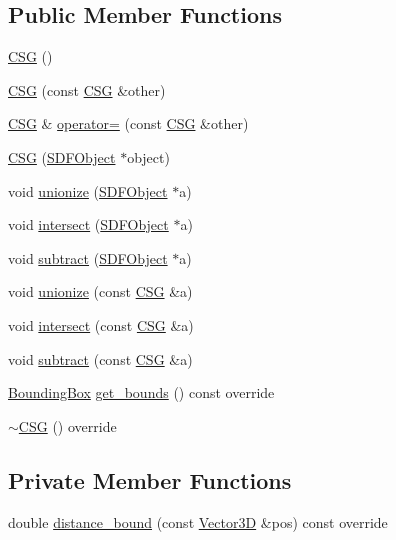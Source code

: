 \subsection*{Public Member Functions}
\begin{DoxyCompactItemize}
\item 
\hyperlink{classCSG_a09bbc9336539ecf40021a9b3ec224afd}{C\+SG} ()
\item 
\hyperlink{classCSG_a9214110752f4bfead01357b5f1f7522e}{C\+SG} (const \hyperlink{classCSG}{C\+SG} \&other)
\item 
\hyperlink{classCSG}{C\+SG} \& \hyperlink{classCSG_a2fed963769aedb056d3f214bfe1413be}{operator=} (const \hyperlink{classCSG}{C\+SG} \&other)
\item 
\hyperlink{classCSG_a93e83c940758238fc7b188555b5a3787}{C\+SG} (\hyperlink{classSDFObject}{S\+D\+F\+Object} $\ast$object)
\item 
void \hyperlink{classCSG_a5b18efa47eb13a12633d0f5b5c1df165}{unionize} (\hyperlink{classSDFObject}{S\+D\+F\+Object} $\ast$a)
\item 
void \hyperlink{classCSG_ac44266e75a0b36097cca17e267df9873}{intersect} (\hyperlink{classSDFObject}{S\+D\+F\+Object} $\ast$a)
\item 
void \hyperlink{classCSG_a2f7550a90e950e8b143e4556b03a2a32}{subtract} (\hyperlink{classSDFObject}{S\+D\+F\+Object} $\ast$a)
\item 
void \hyperlink{classCSG_aed60985ee9a6fa106a48da72bc14582d}{unionize} (const \hyperlink{classCSG}{C\+SG} \&a)
\item 
void \hyperlink{classCSG_a1a3764a10ea7681673844ed106681569}{intersect} (const \hyperlink{classCSG}{C\+SG} \&a)
\item 
void \hyperlink{classCSG_a34a2197ec5dca9d43f88cfacbffdda53}{subtract} (const \hyperlink{classCSG}{C\+SG} \&a)
\item 
\hyperlink{classBoundingBox}{Bounding\+Box} \hyperlink{classCSG_abf2daf252f0b53f094ee5336eafb57ac}{get\+\_\+bounds} () const override
\item 
\hyperlink{classCSG_a37f03d2821dec9ee614ec6407758ba17}{$\sim$\+C\+SG} () override
\end{DoxyCompactItemize}
\subsection*{Private Member Functions}
\begin{DoxyCompactItemize}
\item 
double \hyperlink{classCSG_a7dc0853ae99ffd54ea99eccdc5fd5acf}{distance\+\_\+bound} (const \hyperlink{classVector3D}{Vector3D} \&pos) const override
\end{DoxyCompactItemize}
